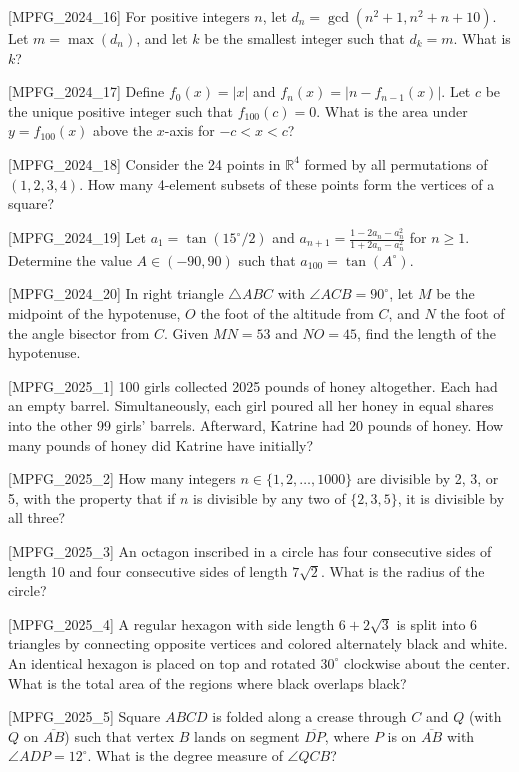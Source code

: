 [MPFG_2024_16]
For positive integers $n$, let $d_n = \gcd(n^2 + 1, n^2 + n + 10)$. Let $m = \max(d_n)$, and let $k$ be the smallest integer such that $d_k = m$. What is $k$?

[MPFG_2024_17]
Define $f_0(x) = |x|$ and $f_n(x) = |n - f_{n-1}(x)|$. Let $c$ be the unique positive integer such that $f_{100}(c) = 0$. What is the area under $y = f_{100}(x)$ above the $x$-axis for $-c < x < c$?

[MPFG_2024_18]
Consider the 24 points in $\mathbb{R}^4$ formed by all permutations of $(1, 2, 3, 4)$. How many 4-element subsets of these points form the vertices of a square?

[MPFG_2024_19]
Let $a_1 = \tan(15^\circ / 2)$ and $a_{n+1} = \frac{1 - 2a_n - a_n^2}{1 + 2a_n - a_n^2}$ for $n \ge 1$. Determine the value $A \in (-90, 90)$ such that $a_{100} = \tan(A^\circ)$.

[MPFG_2024_20]
In right triangle $\triangle ABC$ with $\angle ACB = 90^\circ$, let $M$ be the midpoint of the hypotenuse, $O$ the foot of the altitude from $C$, and $N$ the foot of the angle bisector from $C$. Given $MN = 53$ and $NO = 45$, find the length of the hypotenuse.

[MPFG_2025_1]
100 girls collected 2025 pounds of honey altogether. Each had an empty barrel. Simultaneously, each girl poured all her honey in equal shares into the other 99 girls' barrels. Afterward, Katrine had 20 pounds of honey. How many pounds of honey did Katrine have initially?

[MPFG_2025_2]
How many integers $n \in \{1, 2, \dots, 1000\}$ are divisible by 2, 3, or 5, with the property that if $n$ is divisible by any two of $\{2, 3, 5\}$, it is divisible by all three?

[MPFG_2025_3]
An octagon inscribed in a circle has four consecutive sides of length 10 and four consecutive sides of length $7\sqrt{2}$. What is the radius of the circle?

[MPFG_2025_4]
A regular hexagon with side length $6+2\sqrt{3}$ is split into 6 triangles by connecting opposite vertices and colored alternately black and white. An identical hexagon is placed on top and rotated $30^\circ$ clockwise about the center. What is the total area of the regions where black overlaps black?

[MPFG_2025_5]
Square $ABCD$ is folded along a crease through $C$ and $Q$ (with $Q$ on $\overline{AB}$) such that vertex $B$ lands on segment $\overline{DP}$, where $P$ is on $\overline{AB}$ with $\angle ADP = 12^\circ$. What is the degree measure of $\angle QCB$?

